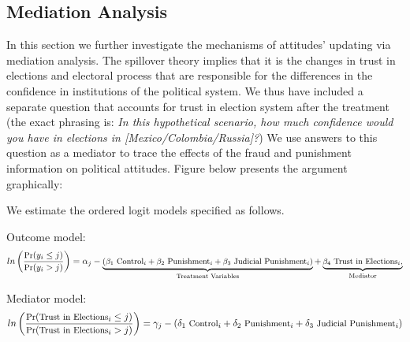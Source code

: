 \documentclass[11pt, ngerman,english,a4]{article}
\begin{document}
    
\clearpage
\subsection*{Mediation Analysis}

\onehalfspacing
In this section we further investigate the mechanisms of attitudes' updating via mediation analysis. The spillover theory implies that it is the changes in trust in elections and electoral process that are responsible for the differences in the confidence in institutions of the political system. We thus have included a separate question that accounts for trust in election system after the treatment (the exact phrasing is: \textit{In this hypothetical scenario, how much confidence would you have in elections in [Mexico/Colombia/Russia]?}) We use answers to this question as a mediator to trace the effects of the fraud and punishment information on political attitudes. Figure below presents the argument graphically:

\begin{figure}[H]
	\centering
\end{figure}

\noindent We estimate the ordered logit models specified as follows.

\noindent Outcome model:
\begin{equation}
	\small
	ln \left (\frac{\text{Pr}(y_i \leq j)}{\text{Pr}(y_i > j)} \right) = \alpha_j - \underbrace{
		({\beta_1} {\text{ Control}_i} + 
		\beta_2 {\text{ Punishment}_i} + 
		\beta_3 {\text{ Judicial Punishment}_i})
		}_{\text{Treatment Variables}} +
	\underbrace{\beta_4 \text{ Trust in Elections}_i,}_{
		\text{Mediator}}
\end{equation}

\noindent Mediator model:
\begin{equation}
	\small
	ln \left (\frac{\text{Pr}(\text{Trust in Elections}_i \leq j)}{\text{Pr}(\text{Trust in Elections}_i > j)} \right) =\gamma_j - 
	({\delta_1} {\text{ Control}_i} + 
	\delta_2 {\text{ Punishment}_i} + 
	\delta_3 {\text{ Judicial Punishment}_i})
\end{equation}
\end{document}

